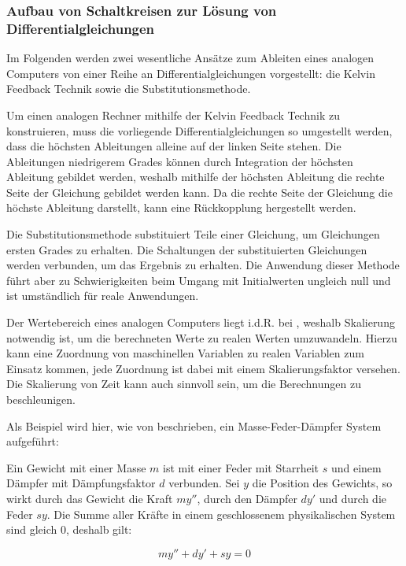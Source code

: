 \subsubsection{Aufbau von Schaltkreisen zur Lösung von Differentialgleichungen}

Im Folgenden werden zwei wesentliche Ansätze zum Ableiten eines analogen Computers von einer Reihe an Differentialgleichungen vorgestellt: die Kelvin Feedback Technik sowie die Substitutionsmethode.

Um einen analogen Rechner mithilfe der Kelvin Feedback Technik zu konstruieren, muss die vorliegende Differentialgleichungen so umgestellt werden, dass die höchsten Ableitungen alleine auf der linken Seite stehen. Die Ableitungen niedrigerem Grades können durch Integration der höchsten Ableitung gebildet werden, weshalb mithilfe der höchsten Ableitung die rechte Seite der Gleichung gebildet werden kann. Da die rechte Seite der Gleichung die höchste Ableitung darstellt, kann eine Rückkopplung hergestellt werden. \cite[vgl. S. 153 ff.]{Ulmann2022}

Die Substitutionsmethode substituiert Teile einer Gleichung, um Gleichungen ersten Grades zu erhalten. Die Schaltungen der substituierten Gleichungen werden verbunden, um das Ergebnis zu erhalten. Die Anwendung dieser Methode führt aber zu Schwierigkeiten beim Umgang mit Initialwerten ungleich null und ist umständlich für reale Anwendungen. \cite[vgl. S. 155 ff.]{Ulmann2022}

Der Wertebereich eines analogen Computers liegt i.d.R. bei , weshalb Skalierung notwendig ist, um die berechneten Werte zu realen Werten umzuwandeln. Hierzu kann eine Zuordnung von maschinellen Variablen zu realen Variablen zum Einsatz kommen, jede Zuordnung ist dabei mit einem Skalierungsfaktor versehen. Die Skalierung von Zeit kann auch sinnvoll sein, um die Berechnungen zu beschleunigen. \cite[vgl. S. 162 ff.]{Ulmann2022}

Als Beispiel wird hier, wie von \cite[S. 168 ff.]{Ulmann2022} beschrieben, ein Masse-Feder-Dämpfer System aufgeführt:

Ein Gewicht mit einer Masse \(m\) ist mit einer Feder mit Starrheit \(s\) und einem Dämpfer mit Dämpfungsfaktor \(d\) verbunden. Sei \(y\) die Position des Gewichts, so wirkt durch das Gewicht die Kraft \(my''\), durch den Dämpfer \(dy'\) und durch die Feder \(sy\). Die Summe aller Kräfte in einem geschlossenem physikalischen System sind gleich 0, deshalb gilt:

\[my''+dy'+sy=0\]

